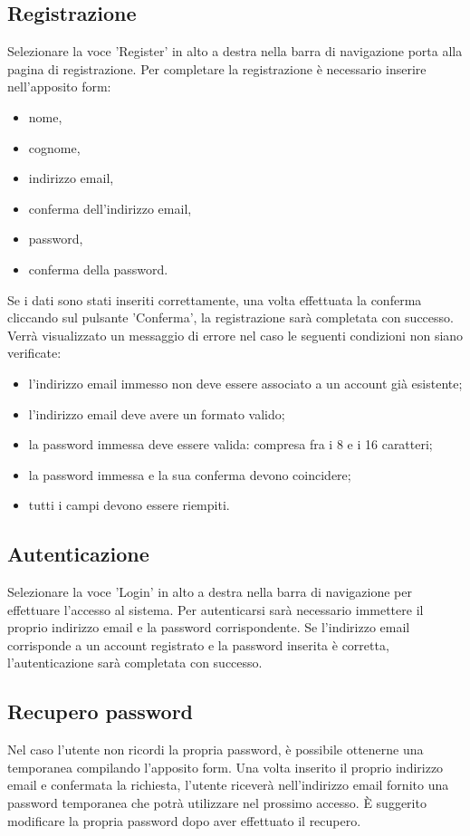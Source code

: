 \documentclass[a4paper, titlepage]{article}
\begin{document}
	\subsection{Registrazione}
	Selezionare la voce 'Register' in alto a destra nella barra di navigazione porta alla pagina di registrazione.
	Per completare la registrazione è necessario inserire nell'apposito form:
	\begin{itemize}
		\item nome,
		\item cognome,
		\item indirizzo email,
		\item conferma dell'indirizzo email,
		\item password,
		\item conferma della password.
	\end{itemize}
	Se i dati sono stati inseriti correttamente, una volta effettuata la conferma cliccando sul pulsante 'Conferma', la registrazione sarà completata con successo.
	Verrà visualizzato un messaggio di errore nel caso le seguenti condizioni non siano verificate:
	\begin{itemize}
		\item l'indirizzo email immesso non deve essere associato a un account già esistente;
		\item l'indirizzo email deve avere un formato valido;
		\item la password immessa deve essere valida: compresa fra i 8 e i 16 caratteri;
		\item la password immessa e la sua conferma devono coincidere;
		\item tutti i campi devono essere riempiti.
	\end{itemize}
	
	\subsection{Autenticazione}
	Selezionare la voce 'Login' in alto a destra nella barra di navigazione per effettuare l'accesso al sistema. Per autenticarsi sarà necessario immettere il proprio indirizzo email e la password corrispondente. Se l'indirizzo email corrisponde a un account registrato e la password inserita è corretta, l'autenticazione sarà completata con successo.

	\subsection{Recupero password}
	Nel caso l'utente non ricordi la propria password, è possibile ottenerne una temporanea compilando l'apposito form. Una volta inserito il proprio indirizzo email e confermata la richiesta, l'utente riceverà nell'indirizzo email fornito una password temporanea che potrà utilizzare nel prossimo accesso. È suggerito modificare la propria password dopo aver effettuato il recupero.
	
\end{document}
